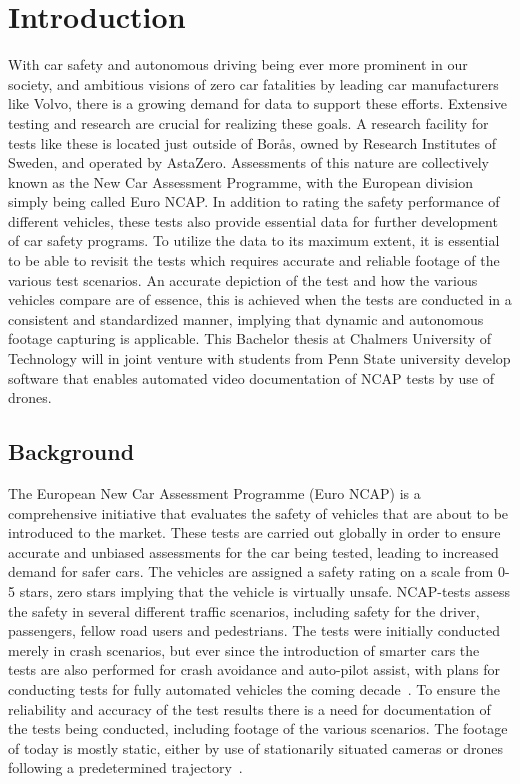 \chapter{Introduction}

With car safety and autonomous driving being ever more prominent in our society, and ambitious visions of zero car fatalities by leading car manufacturers like Volvo, there is a growing demand for data to support these efforts. Extensive testing and research are crucial for realizing these goals. A research facility for tests like these is located just outside of Borås, owned by Research Institutes of Sweden, and operated by AstaZero. Assessments of this nature are collectively known as the New Car Assessment Programme, with the European division simply being called Euro NCAP. In addition to rating the safety performance of different vehicles, these tests also provide essential data for further development of car safety programs. To utilize the data to its maximum extent, it is essential to be able to revisit the tests which requires accurate and reliable footage of the various test scenarios. An accurate depiction of the test and how the various vehicles compare are of essence, this is achieved when the tests are conducted in a consistent and standardized manner, implying that dynamic and autonomous footage capturing is applicable. This Bachelor thesis at Chalmers University of Technology will in joint venture with students from Penn State university develop software that enables automated video documentation of NCAP tests by use of drones. 
\section{Background}
The European New Car Assessment Programme (Euro NCAP) is a comprehensive initiative that evaluates the safety of vehicles that are about to be introduced to the market. These tests are carried out globally in order to ensure accurate and unbiased assessments for the car being tested, leading to increased demand for safer cars. The vehicles are assigned a safety rating on a scale from 0-5 stars, zero stars implying that the vehicle is virtually unsafe. NCAP-tests assess the safety in several different traffic scenarios, including safety for the driver, passengers, fellow road users and pedestrians. The tests were initially conducted merely in crash scenarios, but ever since the introduction of smarter cars the tests are also performed for crash avoidance and auto-pilot assist, with plans for conducting tests for fully automated vehicles the coming decade~\cite{EuroNCAP2022EuroMobility}. 
\bigskip
\newline
To ensure the reliability and accuracy of the test results there is a need for documentation of the tests being conducted, including footage of the various scenarios. The footage of today is mostly static, either by use of stationarily situated cameras or drones following a predetermined trajectory~\cite{EuroNCAP2021EUROPEANPROTOCOL}. 
\bigskip
\newline
